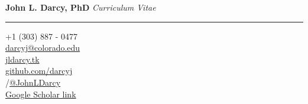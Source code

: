 \documentclass{article}
\begin{document}
{\Huge \textbf{John L. Darcy, PhD}}
\hfill
\emph{Curriculum Vitae}
\vspace{1mm}
\hrule
\vspace{2mm}
\begin{adjustwidth}{5mm}{}
  \begin{multicols}{3}
    \faPhone \space +1 (303) 887 - 0477\\
    \faEnvelope \space \href{mailto:darcyj@colorado.edu}{darcyj@colorado.edu}\\
    \faGlobe \space \href{http://www.jldarcy.tk/}{jldarcy.tk}\\
    \faGithub \space \href{https://github.com/darcyj}{github.com/darcyj}\\
    \faInstagram/\faTwitter \space \href{https://www.instagram.com/jld.adventures/}{@JohnLDarcy}\\
    \faMortarBoard \space \href{https://scholar.google.com/citations?user=z24F3PYAAAAJ}{Google Scholar link}
  \end{multicols}
\end{adjustwidth}
\end{document}
